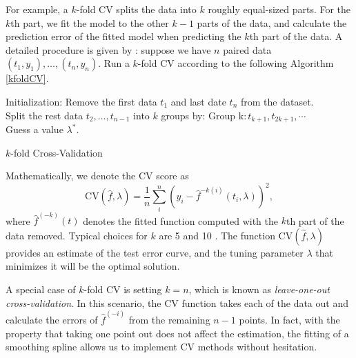 For example, a $k$-fold CV splits the data into $k$ roughly equal-sized parts. For the $k$th part, we fit the model to the other $k-1$ parts of the data, and calculate the prediction error of the fitted model when predicting the $k$th part of the data. A detailed procedure is given by \cite{wahba1975completely}: suppose we have $n$ paired data $(t_1,y_1), \ldots, (t_n,y_n)$. Run a $k$-fold CV according to the following Algorithm \ref{kfoldCV}. 
\begin{algorithm}[h]
\SetAlgoLined 
Initialization: Remove the first data $t_1$ and last date $t_n$ from the dataset. \\
Split the rest data $t_2,\ldots,t_{n-1}$ into $k$ groups by: $ \mbox{Group k} : t_{k+1}, t_{2k+1}, \cdots$ \\
Guess a value $\lambda^*$. \\
\caption{$k$-fold Cross-Validation}\label{kfoldCV}
\end{algorithm}
Mathematically, we denote the CV score as 
\begin{equation*}
\mbox{CV}(\hat{f},\lambda) = \frac{1}{n}\sum_i^n \left( y_i -\hat{f}^{-k(i)}(t_i,\lambda) \right)^2,
\end{equation*}
where $\hat{f}^{(-k)}(t)$ denotes the fitted function computed with the $k$th part of the data removed. Typical choices for $k$ are 5 and 10 \citep{esl2009}.  The function $\mbox{CV}(\hat{f},\lambda)$ provides an estimate of the test error curve, and the tuning parameter $\lambda$ that minimizes it will be the optimal solution. 

A special case of $k$-fold CV is setting $k=n$, which is known as \textit{leave-one-out cross-validation}. In this scenario, the CV function takes each of the data out and calculate the errors of $\hat{f}^{(-i)}$ from the remaining $n-1$ points. In fact, with the property that taking one point out does not affect the estimation, the fitting of a smoothing spline allows us to implement CV methods without hesitation. 

